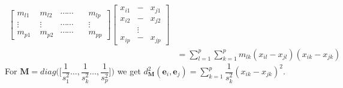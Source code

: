 \begin{notechapter}
\begin{align*}
\begin{bmatrix*}
    m_{{l}{1}}& \; m_{{l}{2}}&  \cdots \cdots  \quad &m_{{l}{p}}\\
    \vdots& \; \vdots& \cdots \cdots  \quad &\vdots \\
    m_{{p}{1}}& \; m_{{p}{2}}&  \cdots \cdots  \quad &m_{{p}{p}}
\end{bmatrix*}
\begin{bmatrix*}
    x_{{i}{1}} & - & x_{{j}{1}} \\
    x_{{i}{2}} & - & x_{{j}{2}} \\
            & \vdots & \\
    x_{{i}{p}} & - &x_{{j}{p}}
\end{bmatrix*}\\
&=
\displaystyle\sum\limits_{l=1}^{p}\displaystyle\sum\limits_{k=1}^{p}m_{{l}{k}}(x_{{i}{l}} - x_{{j}{l}})(x_{{i}{k}} - x_{{j}{k}})
\end{align*}
%
For $\textbf{M} = diag \big( \big[\dfrac{1}{s_{1}^2} \dots, \dfrac{1}{s_{k}^2} \dots, \dfrac{1}{s_{p}^2} \big] \big)$ 
we get $d_{\textbf{M}}^2(\mathbf{e}_{i}, \mathbf{e}_{j}) = 
\displaystyle\sum\limits_{k=1}^{p}\dfrac{1}{{s}_{k}^2}(x_{{i}{k}} - x_{{j}{k}})^2$.
%

\end{notechapter}
